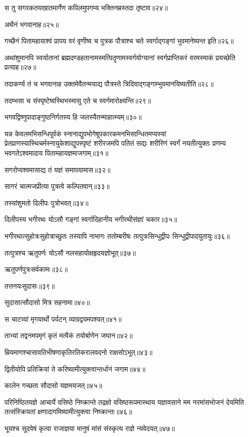 \begin{flushleft}
स तु सगरकतयखातमार्गेण कपिलमुपगम्य भक्तिनम्रस्तदा तृष्टाव॥२४॥

अथैनं भगवानाह॥२५॥

गच्छैनं पितामहायाश्वं प्रापय वरं वृणीष्व च पुत्रक पौत्राश्च चते स्वर्गाद्गङ्गां भुवमानेष्यन्त इति॥२६॥

अथांशुमानपि स्वर्यातानां ब्रह्मदण्डहतानामस्मत्पितॄणामस्वर्गयोग्यानां स्वर्गप्राप्तिकरं वरमस्माकं प्रयच्छेति प्रत्याह॥२७॥

तदाकर्ण्य तं च भगवानाह उक्तमेवैतन्मयाद्य पौत्रस्ते त्रिदिवाद्गङ्गाम्भुवमानयिष्यतीति॥२८॥

तदम्भसा च संस्पृष्टेष्वस्थिभस्मासु एते च स्वर्गमारोक्ष्यन्ति॥२९॥

भगवद्विष्णुपादाङ्गुष्ठनिर्गतस्य हि जलस्यैतन्माहात्म्यम्॥३०॥

यन्न केवलमभिसन्धिपूर्वकं स्नानाद्युपभोगेषूपकारकमनभिसान्धितमप्यस्यां प्रेतप्राणस्यास्थिचर्मस्नायुकेशाद्युपस्पृष्टं शरीरजमपि पतितं सद्यः शरीरिणं स्वर्गं नयतीत्युक्तः प्रणम्य भवगतेऽश्वमादाय पितामहायज्ञमाजगाम्॥३१॥

सगरोप्यश्वमासाद्य तं यज्ञं समापयामास॥३२॥

सागरं चात्मजप्रीत्या पुत्रत्वे कल्पितवान्॥३३॥

तस्यांशुमतो दिलीपः पुत्रोभवत्॥३४॥

दिलीपस्य भगीरथः योऽसौ गङ्गां स्वर्गादिहानीय भगीरथीसंज्ञां चकार॥३५॥

भगीरथात्सुहोत्रःसुहोत्राच्छुतः तस्यापि नाभागः ततोम्बरीषः तत्पुत्रःसिन्धुद्वीपः सिन्धुद्वीपादयुतायुः॥३६॥

तत्पुत्रश्च ऋतुपर्णः योऽसौ नलसहायोक्षहृदयज्ञोभूत्॥३७॥

ऋतुपर्णपुत्रःसर्वकामः॥३८॥

तत्तनयःसुदासः॥३९॥

सुदासात्सौदासो मित्र सहनामा॥४०॥

स चाटव्यां मृगयार्थो पर्यटन् व्याग्रद्वयमपश्यत्॥४१॥

ताभ्यां तद्वनमपमृगं कृतं मत्वैकं तयोर्बाणेन जघान॥४२॥

म्रियमाणश्चासावतिभीषणाकृतिरतिकरालवदनो राक्षसोऽभूत्॥४३॥

द्वितीयोपि प्रतिक्रियां ते करिष्यामीत्युक्त्वान्तर्धानं जगाम॥४४॥

कालेन गच्छता सौदासो यज्ञमयजत्॥४५॥

परिनिष्ठितयज्ञे आचार्ये वसिष्ठे निष्क्रान्ते तद्रक्षो वसिष्ठरूपमास्थाय यज्ञावसाने मम नरमांसभोजनं देयमिति तत्संस्क्रियतां क्षणादागमिष्यामीत्युक्त्वा निष्क्रान्तः॥४६॥

भूयश्च सूदवेषं कृत्वा राजाज्ञया मानुषं मांसं संस्कृत्य राज्ञे न्यवेदयत्॥४७॥


\end{flushleft}
